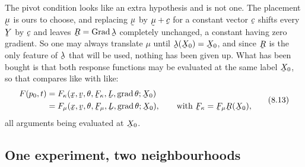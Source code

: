 The pivot condition looks like an extra hypothesis and is not one. The
placement $\vek{\mu}$ is ours to choose, and replacing $\vek{\mu}$ by
$\vek{\mu}+\bc$ for a constant vector $\bc$ shifts every $\bY$ by $\bc$
and leaves $\bR=\Grad\vek{\lambda}$ completely unchanged, a constant
having zero gradient. So one may always translate $\mu$ until
$\vek{\lambda}(\bX_{0})=\bX_{0}$, and since $\bR$ is the only feature of
$\vek{\lambda}$ that will be used, nothing has been given up. What has
been bought is that both response functions may be evaluated at the same
label $\bX_{0}$, so that  compares like with like:
\begin{equation}
\begin{aligned}
   F(p_{0},t)
   &=F_{\kappa}(\bx,\bv,\theta,\bF_{\kappa},\bL,\grad\theta;\bX_{0})\\
   &=F_{\mu}(\bx,\bv,\theta,\bF_{\mu},\bL,\grad\theta;\bX_{0}),
   \qquad\text{with }\bF_{\kappa}=\bF_{\mu}\bR(\bX_{0}),
\end{aligned}
   \tag{8.13}\label{eq:8.13}
\end{equation}
all arguments being evaluated at $\bX_{0}$.

\subsection*{One experiment, two neighbourhoods}

